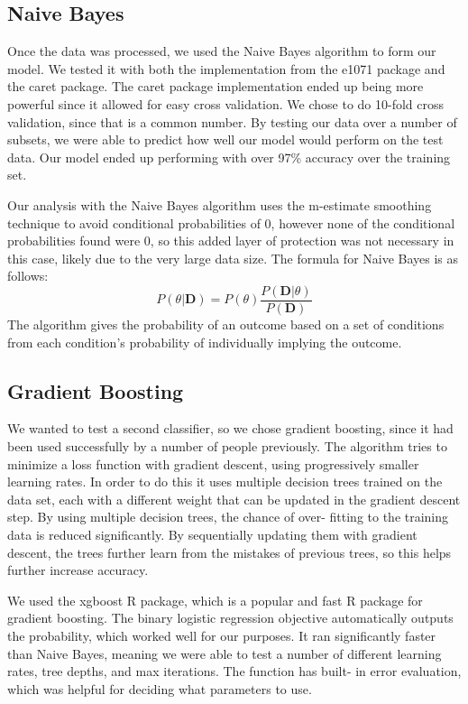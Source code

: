 \documentclass[fleqn,10pt]{SelfArx} %
\begin{document}
\subsection{Naive Bayes}
Once the data was processed, we used the Naive Bayes algorithm to form our model. We tested it with both the implementation from the e1071 package and the caret package. The caret package implementation ended up being more powerful since it allowed for easy cross validation. We chose to do 10-fold cross validation, since that is a common number. By testing our data over a number of subsets, we were able to predict how well our model would perform on the test data. Our model ended up performing with over 97\% accuracy over the training set.

Our analysis with the Naive Bayes algorithm uses the m-estimate smoothing technique to avoid conditional probabilities of 0, however none of the conditional probabilities found were 0, so this added layer of protection was not necessary in this case, likely due to the very large data size. The formula for Naive Bayes is as follows:
\begin{equation}
\label{eq:bayes}
P(\theta|\textbf{D}) = P(\theta ) \frac{P(\textbf{D} |\theta)}{P(\textbf{D})}
\end{equation}
The algorithm gives the probability of an outcome based on a set of conditions from each condition’s probability of individually implying the outcome. 

\subsection{Gradient Boosting}
We wanted to test a second classifier, so we chose gradient boosting, since it had been used successfully by a number of people previously. The algorithm tries to minimize a loss function with gradient descent, using progressively smaller learning rates. In order to do this it uses multiple decision trees trained on the data set, each with a different weight that can be updated in the gradient descent step. By using multiple decision trees, the chance of over- fitting to the training data is reduced significantly. By sequentially updating them with gradient descent, the trees further learn from the mistakes of previous trees, so this helps further increase accuracy. 

We used the xgboost R package, which is a popular and fast R package for gradient boosting. The binary logistic regression objective automatically outputs the probability, which worked well for our purposes. It ran significantly faster than Naive Bayes, meaning we were able to test a number of different learning rates, tree depths, and max iterations. The function has built- in error evaluation, which was helpful for deciding what parameters to use. 
\end{document}
